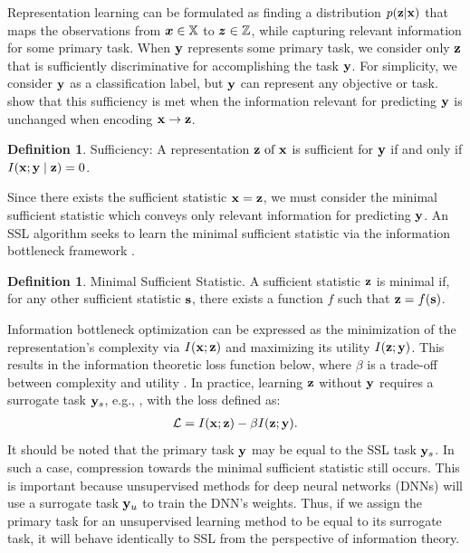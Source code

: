 \documentclass[11pt, oneside]{book}
\theoremstyle{plain}
\theoremstyle{definition}
\newtheorem{definition}[theorem]{Definition}
\theoremstyle{remark}
\begin{document}
Representation learning can be formulated as finding a distribution $p({\mathbf{z}}|{\mathbf{x}})$ that maps the observations from ${\bm{x}} \in {\mathbb{X}}$ to ${\bm{z}} \in {\mathbb{Z}}$, while capturing relevant information for some primary task. When ${\mathbf{y}}$ represents some primary task, we consider only ${\mathbf{z}}$ that is sufficiently discriminative for accomplishing the task ${\mathbf{y}}$. For simplicity, we consider ${\mathbf{y}}$ as a classification label, but ${\mathbf{y}}$ can represent any objective or task. \citet{federici2020learning} show that this sufficiency is met when the information relevant for predicting ${\mathbf{y}}$ is unchanged when encoding ${\mathbf{x}} \rightarrow {\mathbf{z}}$.

\begin{definition}
    Sufficiency: A representation ${\mathbf{z}} \text { of } {\mathbf{x}}$ is sufficient for ${\mathbf{y}}$ if and only if $I({\mathbf{x}} ; {\mathbf{y}} \mid {\mathbf{z}})=0 $.
    \label{definesuff}
\end{definition}

Since there exists the sufficient statistic ${\mathbf{x}}={\mathbf{z}}$, we must consider the minimal sufficient statistic which conveys only relevant information for predicting ${\mathbf{y}}$. An SSL algorithm seeks to learn the minimal sufficient statistic via the information bottleneck framework \citep{shwartz2023compress}.

\begin{definition}
Minimal Sufficient Statistic. A sufficient statistic ${\mathbf{z}}$ is minimal if, for any other sufficient statistic ${\mathbf{s}}$, there exists a function $f$ such that ${\mathbf{z}} = f({\mathbf{s}})$.
\label{defineminsuff}
\end{definition}

Information bottleneck optimization can be expressed as the minimization of the representation's complexity via $I({\mathbf{x}};{\mathbf{z}})$ and maximizing its utility $I({\mathbf{z}};{\mathbf{y}})$. This results in the information theoretic loss function below, where $\beta$ is a trade-off between complexity and utility \citep{shwartz2023compress}. In practice, learning ${\mathbf{z}}$ without ${\mathbf{y}}$ requires a surrogate task ${\mathbf{y}}_{s}$, e.g., \citet{chen2020simple}, with the loss defined as:
\begin{align}
\mathcal{L}=I({\mathbf{x}} ; {\mathbf{z}})-\beta I({\mathbf{z}} ;{\mathbf{y}}).
\end{align}
It should be noted that the primary task ${\mathbf{y}}$ may be equal to the SSL task ${\mathbf{y}}_{s}$. In such a case, compression towards the minimal sufficient statistic still occurs. This is important because unsupervised methods for deep neural networks (DNNs) will use a surrogate task ${\mathbf{y}}_{u}$ to train the DNN's weights. Thus, if we assign the primary task for an unsupervised learning method to be equal to its surrogate task, it will behave identically to SSL from the perspective of information theory.
\end{document}
